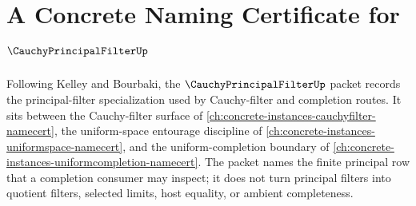 \chapter{A Concrete Naming Certificate for $\CauchyPrincipalFilterUp$}
\label{ch:concrete-instances-cauchy-principal-filter-namecert}

Following Kelley and Bourbaki, the $\CauchyPrincipalFilterUp$ packet records the principal-filter specialization used by Cauchy-filter and completion routes. It sits between the Cauchy-filter surface of \autoref{ch:concrete-instances-cauchyfilter-namecert}, the uniform-space entourage discipline of \autoref{ch:concrete-instances-uniformspace-namecert}, and the uniform-completion boundary of \autoref{ch:concrete-instances-uniformcompletion-namecert}. The packet names the finite principal row that a completion consumer may inspect; it does not turn principal filters into quotient filters, selected limits, host equality, or ambient completeness.

